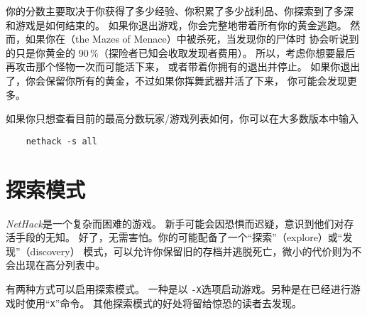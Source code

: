 \documentclass[a4paper, 10pt]{article}
\begin{document}
你的分数主要取决于你获得了多少经验、你积累了多少战利品、你探索到了多深
和游戏是如何结束的。
如果你退出游戏，你会完整地带着所有你的黄金逃跑。
然而，如果你在\zhTransMazesOfMenace{}（the Mazes of Menace）中被杀死，当发现你的尸体时
协会听说到的只是你黄金的 90\,\%（探险者已知会收取发现者费用）。
所以，考虑你想要最后再攻击那个怪物一次而可能活下来，
或者带着你拥有的退出并停止。
如果你退出了，你会保留你所有的黄金，不过如果你挥舞武器并活了下来，
你可能会发现更多。

如果你只想查看目前的最高分数玩家/游戏列表如何，你可以在大多数版本中输入
\begin{verbatim}
    nethack -s all
\end{verbatim}

\section{探索模式}

{\it NetHack\/}是一个复杂而困难的游戏。
新手可能会因恐惧而迟疑，意识到他们对存活手段的无知。
好了，无需害怕。你的\zhTransDungeon{}可能配备了一个“探索”（explore）或“发现”（discovery）
模式，可以允许你保留旧的存档并逃脱死亡，微小的代价则为不会出现在高分列表中。

有两种方式可以启用探索模式。
一种是以 {\tt -X}选项启动游戏。另种是在已经进行游戏时使用“{\tt X}”命令。
其他探索模式的好处将留给惊恐的读者去发现。
\end{document}
